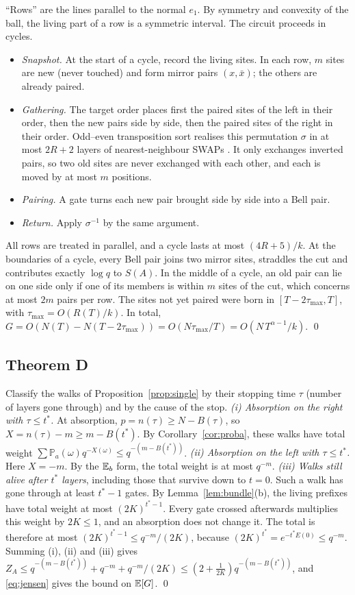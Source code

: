 ``Rows'' are the lines parallel to the normal $e_1$. By symmetry and convexity of the ball, the living part of a row is a symmetric interval. The circuit proceeds in cycles.
\begin{itemize}[leftmargin=*,itemsep=1pt]
\item \emph{Snapshot.} At the start of a cycle, record the living sites. In each row, $m$ sites are new (never touched) and form mirror pairs $(x,\bar x)$; the others are already paired.
\item \emph{Gathering.} The target order places first the paired sites of the left in their order, then the new pairs side by side, then the paired sites of the right in their order. Odd--even transposition sort realises this permutation $\sigma$ in at most $2R+2$ layers of nearest-neighbour SWAPs \cite{Knuth1998}. It only exchanges inverted pairs, so two old sites are never exchanged with each other, and each is moved by at most $m$ positions.
\item \emph{Pairing.} A gate turns each new pair brought side by side into a Bell pair.
\item \emph{Return.} Apply $\sigma^{-1}$ by the same argument.
\end{itemize}
All rows are treated in parallel, and a cycle lasts at most $(4R+5)/k$. At the boundaries of a cycle, every Bell pair joins two mirror sites, straddles the cut and contributes exactly $\log q$ to $S(A)$. In the middle of a cycle, an old pair can lie on one side only if one of its members is within $m$ sites of the cut, which concerns at most $2m$ pairs per row. The sites not yet paired were born in $[T-2\tau_{\max},T]$, with $\tau_{\max}=O(R(T)/k)$. In total, $G=O(N(T)-N(T-2\tau_{\max}))=O(N\tau_{\max}/T)=O(N\,T^{\alpha-1}/k)$.
\qed

\subsection{Theorem D}\label{app:D}

Classify the walks of Proposition~\ref{prop:single} by their stopping time $\tau$ (number of layers gone through) and by the cause of the stop.
\emph{(i) Absorption on the right with $\tau\le t^\ast$.} At absorption, $p=n(\tau)\ge N-B(\tau)$, so $X=n(\tau)-m\ge m-B(t^\ast)$. By Corollary~\ref{cor:proba}, these walks have total weight $\sum\mathbb{P}_a(\omega)q^{-X(\omega)}\le q^{-(m-B(t^\ast))}$.
\emph{(ii) Absorption on the left with $\tau\le t^\ast$.} Here $X=-m$. By the $\mathbb{E}_b$ form, the total weight is at most $q^{-m}$.
\emph{(iii) Walks still alive after $t^\ast$ layers}, including those that survive down to $t=0$. Such a walk has gone through at least $t^\ast-1$ gates. By Lemma~\ref{lem:bundle}(b), the living prefixes have total weight at most $(2K)^{t^\ast-1}$. Every gate crossed afterwards multiplies this weight by $2K\le1$, and an absorption does not change it. The total is therefore at most $(2K)^{t^\ast-1}\le q^{-m}/(2K)$, because $(2K)^{t^\ast}=e^{-t^\ast E(0)}\le q^{-m}$.
Summing (i), (ii) and (iii) gives $Z_A\le q^{-(m-B(t^\ast))}+q^{-m}+q^{-m}/(2K)\le(2+\frac1{2K})q^{-(m-B(t^\ast))}$, and \eqref{eq:jensen} gives the bound on $\mathbb{E}[G]$.
\qed

